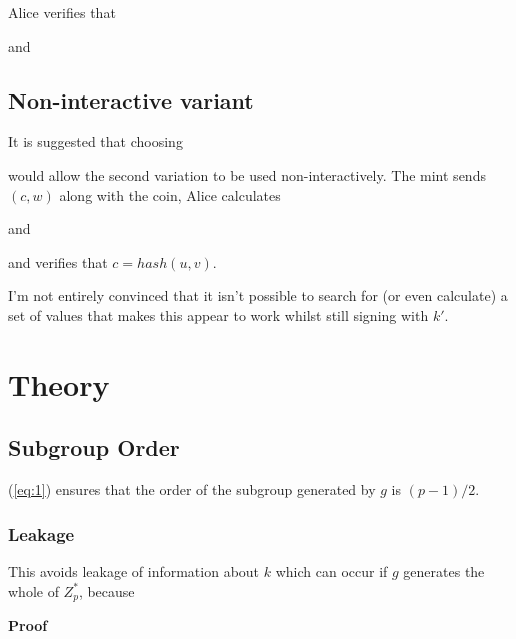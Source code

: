 \documentclass[a4paper,titlepage]{article}
\begin{document}
Alice verifies that


and


\subsection{Non-interactive variant}

It is suggested that choosing


would allow the second variation to be used non-interactively. The
mint sends $(c,w)$ along with the coin, Alice calculates


and


and verifies that $c=hash(u,v)$.

I'm not entirely convinced that it isn't possible to search for (or
even calculate) a set of values that makes this appear to work whilst
still signing with $k'$.

\section{Theory}

\subsection{Subgroup Order}
\label{sec:theory1}

(\ref{eq:1}) ensures that the order of the subgroup generated by $g$ is
$(p-1)/2$.

\subsubsection{Leakage}

This avoids leakage of information about $k$ which can
occur if $g$ generates the whole of $Z_p^*$, because


{\bf Proof}
\end{document}
